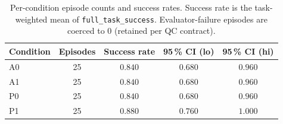 \begin{table}[ht]
\centering
\caption{Per-condition episode counts and success rates.
  Success rate is the task-weighted mean of \texttt{full\_task\_success}.
  Evaluator-failure episodes are coerced to 0 (retained per QC contract).}
\label{tab:condition_summary}
\begin{tabular}{lcccc}
\toprule
Condition & Episodes & Success rate & 95\,\% CI (lo) & 95\,\% CI (hi) \\
\midrule
  A0 & 25 & $0.840$ & $0.680$ & $0.960$ \\
  A1 & 25 & $0.840$ & $0.680$ & $0.960$ \\
  P0 & 25 & $0.840$ & $0.680$ & $0.960$ \\
  P1 & 25 & $0.880$ & $0.760$ & $1.000$ \\
\bottomrule
\end{tabular}
\end{table}
